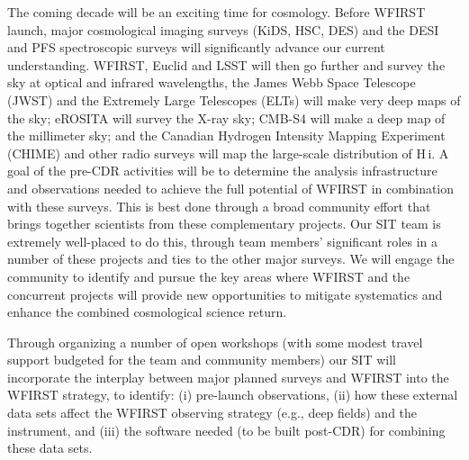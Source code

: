 %
% 

The coming decade will be an exciting time for cosmology. Before WFIRST launch,  major cosmological imaging surveys (KiDS, HSC, DES) and the DESI and PFS spectroscopic surveys will significantly advance our current understanding. WFIRST, Euclid and LSST  will then go further and survey the sky at optical and infrared wavelengths, the  James Webb Space Telescope (JWST) and the Extremely Large Telescopes (ELTs) will make very deep maps of the sky; eROSITA will survey the X-ray sky; CMB-S4 will make a deep map of the millimeter sky; and the Canadian Hydrogen Intensity Mapping Experiment (CHIME) and other radio surveys will map the large-scale distribution of H$\,${\sc i}.
%
%
A  goal of the pre-CDR activities will be to determine the analysis infrastructure and observations needed to achieve the full potential of WFIRST in combination with these  surveys. This is best done through a broad community effort that brings together scientists from these complementary projects. Our SIT team is extremely well-placed to do this, through team members' significant roles in a number of these projects and ties to the other major surveys. We will engage the community to identify and pursue the key areas where WFIRST and the concurrent projects will provide new opportunities to mitigate systematics and enhance the combined cosmological science return. 

Through organizing a number of open workshops (with some modest travel support budgeted for the team and community members) our SIT will incorporate the interplay between major planned surveys and WFIRST into the WFIRST strategy, to identify: (i) pre-launch observations, (ii) how these external data sets affect the WFIRST observing strategy (e.g., deep fields) and the instrument, and (iii) the software needed (to be built post-CDR) for combining these data sets.  

